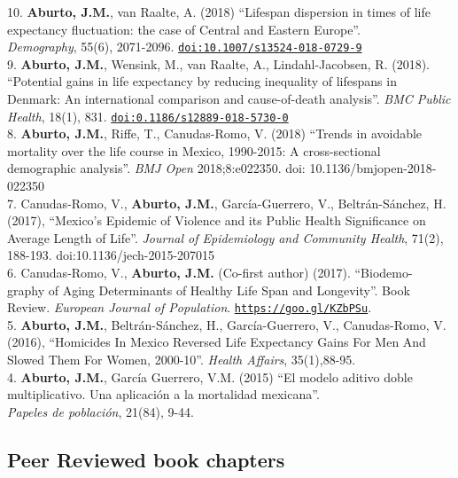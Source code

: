 \documentclass[12pt]{article}
\providecommand*\url[1]{\href{#1}{#1}}
\renewcommand*\url[1]{\href{#1}{\texttt{#1}}}
\begin{document}
10. \textbf{Aburto, J.M.}, van Raalte, A. (2018) ``Lifespan dispersion in times of life expectancy fluctuation: the case of Central and Eastern Europe''.\\ \textit{Demography}, 55(6), 2071-2096. \url{doi:10.1007/s13524-018-0729-9} \\

9. \textbf{Aburto, J.M.}, Wensink, M., van Raalte, A., Lindahl-Jacobsen, R. (2018). ``Potential gains in life expectancy by reducing inequality of lifespans in Denmark: An international comparison and cause-of-death analysis''. \emph{BMC Public Health}, 18(1), 831. \url{doi:0.1186/s12889-018-5730-0} \\

8. \textbf{Aburto, J.M.}, Riffe, T., Canudas-Romo, V. (2018) ``Trends in avoidable mortality over the life course in Mexico, 1990-2015:  A cross-sectional demographic analysis''. \emph{BMJ Open} 2018;8:e022350. doi: 10.1136/bmjopen-2018-022350 \\

7. Canudas-Romo, V.,  \textbf{Aburto, J.M.}, Garc\'ia-Guerrero, V., Beltr\'an-S\'anchez, H. (2017),  ``Mexico's Epidemic of Violence and its Public Health Significance on Average Length of Life''. \emph{Journal of Epidemiology and Community Health}, 71(2), 188-193. doi:10.1136/jech-2015-207015 \\ 
  
6. Canudas-Romo, V.,  \textbf{Aburto, J.M.} (Co-first author) (2017). ``Biodemo- \\ graphy of Aging Determinants of Healthy Life Span and Longevity''. Book Review. \emph{European Journal of Population}. \url{https://goo.gl/KZbPSu}. \\ 
	 
5. \textbf{Aburto, J.M.}, Beltr\'an-S\'anchez, H., Garc\'ia-Guerrero, V., Canudas-Romo, V. (2016), ``Homicides In Mexico Reversed Life Expectancy Gains For Men And Slowed Them For Women, 2000-10''. \emph{Health Affairs}, 35(1),88-95. \\ 
		     
4. \textbf{Aburto, J.M.}, Garc\'ia Guerrero, V.M. (2015) ``El modelo aditivo doble multiplicativo. Una aplicaci\'on a la mortalidad mexicana''.\\  \emph{Papeles de poblaci\'on}, 21(84), 9-44. \\
		  
\subsection*{Peer Reviewed book chapters}
\end{document}
